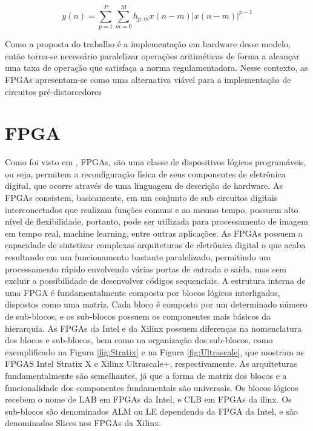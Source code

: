 \begin{equation}
    y(n) = \sum_{p=1}^{P} \sum_{m=0}^{M} h_{p,m} x(n - m) \left| x(n - m) \right|^{p-1}
    \label{eq:mp}
\end{equation}

Como a proposta do trabalho é a implementação em hardware desse modelo, então torna-se necessário paralelizar operações aritiméticas de forma a alcançar uma taxa de operação que satisfaça a norma regulamentadora. Nesse contexto, as FPGAs apresentam-se como uma alternativa viável para a implementação de circuitos pré-distorcedores 

\section{FPGA}

Como foi visto em \cite{Pedroni2010}, FPGAs, são uma classe de dispositivos lógicos programáveis, ou seja, permitem a reconfiguração física de seus componentes de eletrônica digital, que ocorre através de uma linguagem de descrição de hardware. 
As FPGAs consistem, basicamente, em um conjunto de sub circuitos digitais interconectados que realizam funções comuns e ao mesmo tempo, possuem alto nível de flexibilidade, portanto, pode ser utilizada para processamento de imagem em tempo real, machine learning, entre outras aplicações.
As FPGAs possuem a capacidade de sintetizar complexas arquiteturas de eletrônica digital o que acaba resultando em um funcionamento bastante paralelizado, permitindo um processamento rápido envolvendo várias portas de entrada e saída, mas sem excluir a possibilidade de desenvolver códigos sequenciais.
A estrutura interna de uma FPGA é fundamentalmente composta por blocos lógicos interligados, dispostos como uma matriz. Cada bloco é composto por um determinado número de sub-blocos, e os sub-blocos possuem os componentes mais básicos da hierarquia. As FPGAs da Intel e da Xilinx possuem diferenças na nomenclatura dos blocos e sub-blocos, bem como na organização dos sub-blocos, como exemplificado na Figura \ref{fig:Stratix} e na Figura \ref{fig:Ultrascale}, que mostram as FPGAS Intel Stratix X e Xilinx Ultrascale+, respectivamente. As arquiteturas fundamentalmente são semelhantes, já que a forma de matriz dos blocos e a funcionalidade dos componentes fundamentais são universais. Os blocos lógicos recebem o nome de LAB em FPGAs da Intel, e CLB em FPGAs da  ilinx. Os sub-blocos são denominados ALM ou LE dependendo da FPGA da Intel, e são denominados Slices nos FPGAs da Xilinx.

